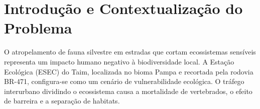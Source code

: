 \documentclass[10pt,conference]{IEEEtran}
\newcommand{\cmtid}{99999}
\begin{document}
\else
  \author{SIBGRAPI Paper ID: \cmtid \\ }
  \linenumbers
\fi


\maketitle







\IEEEpeerreviewmaketitle

\begin{abstract}
Este relatório descreve o desenvolvimento de uma base de conhecimento ontológica voltada para o domínio ecológico e operacional do Banhado do Taim, com foco na redução do atropelamento de fauna silvestre. A arquitetura foi construída no padrão formal OWL 2, estabelecendo uma representação focada nos eventos de atropelamento, nos animais afetados e nas características das rodovias locais. O projeto integrou a extração automática de informações a partir de múltiplas fontes de dados (como Wikipedia, Wikidata e IBGE), utilizando técnicas de Processamento de Linguagem Natural (PLN) para limpar, filtrar e transformar textos dispersos em relações estruturadas. Adicionalmente, desenvolveu-se um módulo de automação para o povoamento sintético da ontologia, alcançando um bom volume de instâncias interconectadas. O modelo gerado é validado por um conjunto de 30 consultas operacionais SPARQL e propõe-se uma base conceitual para a futura integração desse modelo com sistemas de Inteligência Artificial Explicável (XAI).

\end{abstract}

\section{Introdução e Contextualização do Problema}

O atropelamento de fauna silvestre em estradas que cortam ecossistemas sensíveis representa um impacto humano negativo à biodiversidade local. A Estação Ecológica (ESEC) do Taim, localizada no bioma Pampa e recortada pela rodovia BR-471, configura-se como um cenário de vulnerabilidade ecológica. O tráfego interurbano dividindo o ecossistema causa a mortalidade de vertebrados, o efeito de barreira e a separação de habitats.
\end{document}
